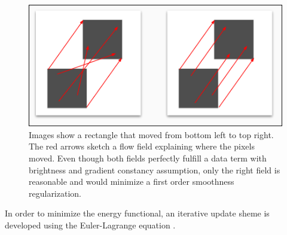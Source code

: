 \documentclass[journal]{vgtc}
\begin{document}
\begin{figure}[htb]
\centering
\includegraphics[width=\linewidth]{images/ambiguousflow.png}
\caption{Images show a rectangle that moved from bottom left to top right. The red arrows sketch a flow field explaining where the pixels moved.
Even though both fields perfectly fulfill a data term with brightness and gradient constancy assumption, only the right field is reasonable and would minimize a first order smoothness regularization.}
\label{fig:ambigdataterm}
\end{figure}

In order to minimize the energy functional, an iterative update sheme is developed using the Euler-Lagrange equation \cite{mathforphysicists}.
\end{document}
